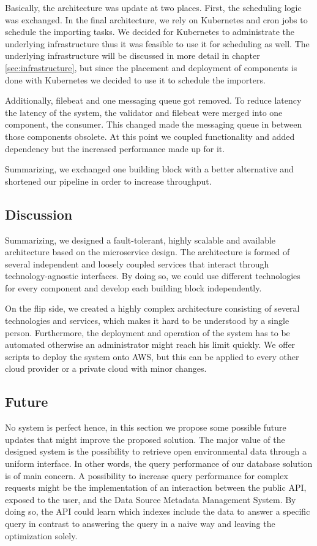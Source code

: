 Basically, the architecture was
update at two places. First, the scheduling logic was exchanged. In the
final architecture, we rely on Kubernetes and cron jobs to schedule the
importing tasks. We decided for Kubernetes to administrate the
underlying infrastructure thus it was feasible to use it for scheduling
as well. The underlying infrastructure will be discussed in more detail
in chapter \ref{sec:infrastructure}, but since the placement and deployment
of components is done with Kubernetes we decided to use it to schedule
the importers.

Additionally, filebeat and one messaging queue got removed. To reduce
latency the latency of the system, the validator and filebeat were
merged into one component, the consumer. This changed made the messaging
queue in between those components obsolete. At this point we coupled
functionality and added dependency but the increased performance made up
for it.

Summarizing, we exchanged one building block with a better alternative
and shortened our pipeline in order to increase throughput.

\subsection{Discussion}\label{discussion}

Summarizing, we designed a fault-tolerant, highly scalable and available
architecture based on the microservice design. The architecture is
formed of several independent and loosely coupled services that interact
through technology-agnostic interfaces. By doing so, we could use
different technologies for every component and develop each building
block independently.

On the flip side, we created a highly complex architecture consisting of
several technologies and services, which makes it hard to be understood
by a single person. Furthermore, the deployment and operation of the
system has to be automated otherwise an administrator might reach his
limit quickly. We offer scripts to deploy the system onto AWS, but this
can be applied to every other cloud provider or a private cloud with
minor changes.

\subsection{Future}\label{future}

No system is perfect hence, in this section we propose some possible
future updates that might improve the proposed solution. The major value
of the designed system is the possibility to retrieve open environmental
data through a uniform interface. In other words, the query performance
of our database solution is of main concern. A possibility to increase
query performance for complex requests might be the implementation of an
interaction between the public API, exposed to the user, and the Data
Source Metadata Management System. By doing so, the API could learn
which indexes include the data to answer a specific query in contrast to
answering the query in a naive way and leaving the optimization solely.

